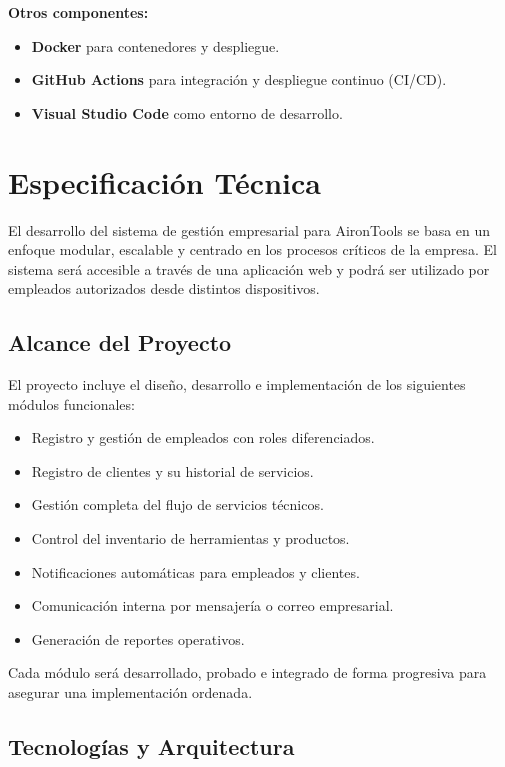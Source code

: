 \textbf{Otros componentes:}
\begin{itemize}
    \item \textbf{Docker} para contenedores y despliegue.
    \item \textbf{GitHub Actions} para integración y despliegue continuo (CI/CD).
    \item \textbf{Visual Studio Code} como entorno de desarrollo.
\end{itemize}








\section{Especificación Técnica}

El desarrollo del sistema de gestión empresarial para AironTools se basa en un enfoque modular, escalable y centrado en los procesos críticos de la empresa. El sistema será accesible a través de una aplicación web y podrá ser utilizado por empleados autorizados desde distintos dispositivos.

\subsection{Alcance del Proyecto}

El proyecto incluye el diseño, desarrollo e implementación de los siguientes módulos funcionales:

\begin{itemize}
    \item Registro y gestión de empleados con roles diferenciados.
    \item Registro de clientes y su historial de servicios.
    \item Gestión completa del flujo de servicios técnicos.
    \item Control del inventario de herramientas y productos.
    \item Notificaciones automáticas para empleados y clientes.
    \item Comunicación interna por mensajería o correo empresarial.
    \item Generación de reportes operativos.
\end{itemize}

Cada módulo será desarrollado, probado e integrado de forma progresiva para asegurar una implementación ordenada.

\subsection{Tecnologías y Arquitectura}


